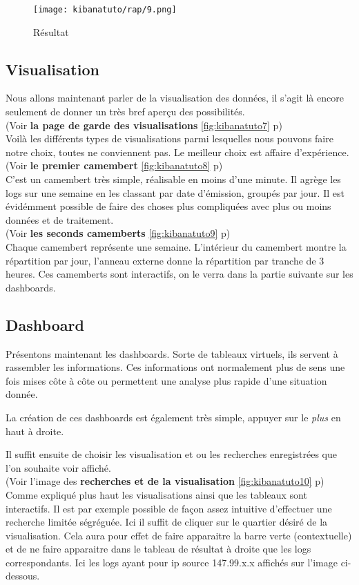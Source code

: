 \begin{figure}[H]
\center
\texttt{[image: kibanatuto/rap/9.png]}
\label{fig:kibanatuto6}
\caption{Résultat}
\end{figure}

\subsection{Visualisation}
Nous allons maintenant parler de la visualisation des données, il s'agit là encore
seulement de donner un très bref aperçu des possibilités.\\[2mm]
(Voir \textbf{la page de garde des visualisations} \ref{fig:kibanatuto7} p\pageref{fig:kibanatuto7})\\[2mm]
Voilà les différents types de visualisations parmi lesquelles nous pouvons faire 
notre choix,  toutes ne conviennent pas. Le meilleur choix est affaire d'expérience.\\[2mm]
(Voir \textbf{le premier camembert} \ref{fig:kibanatuto8} p\pageref{fig:kibanatuto8})\\[2mm]
C'est un camembert très simple, réalisable en moins d'une minute. Il agrège les logs
sur une semaine en les classant par date d'émission, groupés par jour. 
Il est évidémment possible de faire des choses plus compliquées avec plus ou moins
données et de traitement.\\[2mm]
(Voir \textbf{les seconds camemberts} \ref{fig:kibanatuto9} p\pageref{fig:kibanatuto9})\\[2mm]
Chaque camembert représente une semaine. L'intérieur du camembert montre la répartition
par jour, l'anneau externe donne la répartition par tranche de 3 heures. Ces camemberts 
sont interactifs, on le verra dans la partie suivante sur les dashboards.


\subsection{Dashboard}
Présentons maintenant les dashboards. Sorte de tableaux virtuels, ils servent à rassembler
les informations. Ces informations ont normalement plus de sens une fois mises côte 
à côte ou permettent une analyse plus rapide d'une situation donnée.

La création de ces dashboards est également très simple, appuyer sur le \textit{plus}
en haut à droite.

Il suffit ensuite de choisir les visualisation et ou les recherches enregistrées 
que l'on souhaite voir affiché.\\[2mm]
(Voir l'image des \textbf{recherches et de la visualisation} \ref{fig:kibanatuto10} p\pageref{fig:kibanatuto10})\\[2mm]
Comme expliqué plus haut les visualisations ainsi que les tableaux sont interactifs.
Il est par exemple possible de façon assez intuitive d'effectuer une recherche limitée ségréguée.
Ici il suffit de cliquer sur le quartier désiré de la visualisation. Cela aura pour 
effet de faire apparaitre la barre verte (contextuelle) et de ne faire apparaitre 
dans le tableau de résultat à droite que les \gls{logs} correspondants. Ici les logs ayant
pour ip source 147.99.x.x affichés sur l'image ci-dessous.

